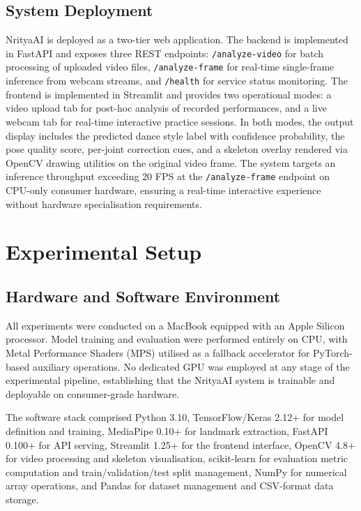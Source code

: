 \documentclass[journal]{IEEEtran}
\begin{document}
\subsection{System Deployment}

NrityaAI is deployed as a two-tier web application. The backend
is implemented in FastAPI and exposes three REST endpoints:
\texttt{/analyze-video} for batch processing of uploaded video files,
\texttt{/analyze-frame} for real-time single-frame inference from
webcam streams, and \texttt{/health} for service status monitoring.
The frontend is implemented in Streamlit and provides two operational
modes: a video upload tab for post-hoc analysis of recorded performances,
and a live webcam tab for real-time interactive practice sessions.
In both modes, the output display includes the predicted dance style
label with confidence probability, the pose quality score, per-joint
correction cues, and a skeleton overlay rendered via OpenCV drawing
utilities on the original video frame. The system targets an inference
throughput exceeding 20 FPS at the \texttt{/analyze-frame} endpoint
on CPU-only consumer hardware, ensuring a real-time interactive
experience without hardware specialisation requirements.

\section{Experimental Setup}
\label{sec:setup}

\subsection{Hardware and Software Environment}

All experiments were conducted on a MacBook equipped with an Apple
Silicon processor. Model training and evaluation were performed
entirely on CPU, with Metal Performance Shaders (MPS) utilised as a
fallback accelerator for PyTorch-based auxiliary operations. No
dedicated GPU was employed at any stage of the experimental pipeline,
establishing that the NrityaAI system is trainable and deployable
on consumer-grade hardware.

The software stack comprised Python 3.10, TensorFlow/Keras 2.12+
for model definition and training, MediaPipe 0.10+ for landmark
extraction, FastAPI 0.100+ for API serving, Streamlit 1.25+ for the
frontend interface, OpenCV 4.8+ for video processing and skeleton
visualisation, scikit-learn for evaluation metric computation and
train/validation/test split management, NumPy for numerical array
operations, and Pandas for dataset management and CSV-format data
storage.
\end{document}
